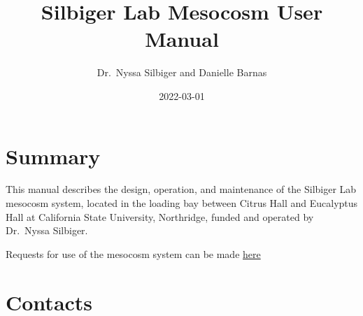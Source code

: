 \documentclass[
]{book}
\title{Silbiger Lab Mesocosm User Manual}
\author{Dr.~Nyssa Silbiger and Danielle Barnas}
\date{2022-03-01}
\begin{document}
\maketitle

{
\setcounter{tocdepth}{1}
\tableofcontents
}
\hypertarget{summary}{%
\chapter{Summary}\label{summary}}

This manual describes the design, operation, and maintenance of the Silbiger Lab mesocosm system, located in the loading bay between Citrus Hall and Eucalyptus Hall at California State University, Northridge, funded and operated by Dr.~Nyssa Silbiger.

Requests for use of the mesocosm system can be made \href{https://docs.google.com/forms/d/1LCZG39k8dJmIDLb5l6XBP8-Ow2yxawrKlUB2wUDesqg/edit}{here}

\hypertarget{contacts}{%
\chapter{Contacts}\label{contacts}}
\end{document}
